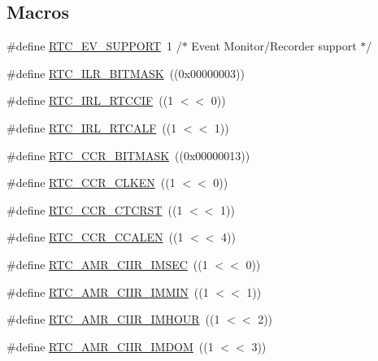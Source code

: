 \subsection*{Macros}
\begin{DoxyCompactItemize}
\item 
\#define \hyperlink{group___r_t_c__18_x_x__43_x_x_gaeebb09cabedc374d2fd54020862be3cf}{R\+T\+C\+\_\+\+E\+V\+\_\+\+S\+U\+P\+P\+O\+RT}~1				/$\ast$ Event Monitor/Recorder support $\ast$/
\item 
\#define \hyperlink{group___r_t_c__18_x_x__43_x_x_ga9c00baff0fca4f8e747fadfe9ee12775}{R\+T\+C\+\_\+\+I\+L\+R\+\_\+\+B\+I\+T\+M\+A\+SK}~((0x00000003))
\item 
\#define \hyperlink{group___r_t_c__18_x_x__43_x_x_gaf706fff68e830a082d476467fe71f297}{R\+T\+C\+\_\+\+I\+R\+L\+\_\+\+R\+T\+C\+C\+IF}~((1 $<$$<$ 0))
\item 
\#define \hyperlink{group___r_t_c__18_x_x__43_x_x_ga237351d2c7f08b447254eff9578eb11e}{R\+T\+C\+\_\+\+I\+R\+L\+\_\+\+R\+T\+C\+A\+LF}~((1 $<$$<$ 1))
\item 
\#define \hyperlink{group___r_t_c__18_x_x__43_x_x_gadc461b6f544d66841e09499b2b9734c7}{R\+T\+C\+\_\+\+C\+C\+R\+\_\+\+B\+I\+T\+M\+A\+SK}~((0x00000013))
\item 
\#define \hyperlink{group___r_t_c__18_x_x__43_x_x_gad08af035635f5acd7931cb982f95e771}{R\+T\+C\+\_\+\+C\+C\+R\+\_\+\+C\+L\+K\+EN}~((1 $<$$<$ 0))
\item 
\#define \hyperlink{group___r_t_c__18_x_x__43_x_x_ga70900054432c82dad7d63d4598502923}{R\+T\+C\+\_\+\+C\+C\+R\+\_\+\+C\+T\+C\+R\+ST}~((1 $<$$<$ 1))
\item 
\#define \hyperlink{group___r_t_c__18_x_x__43_x_x_gaeb77b2340d896fae77ea670bb70e972e}{R\+T\+C\+\_\+\+C\+C\+R\+\_\+\+C\+C\+A\+L\+EN}~((1 $<$$<$ 4))
\item 
\#define \hyperlink{group___r_t_c__18_x_x__43_x_x_ga30c785b6017020d4c0b61b22aff30aac}{R\+T\+C\+\_\+\+A\+M\+R\+\_\+\+C\+I\+I\+R\+\_\+\+I\+M\+S\+EC}~((1 $<$$<$ 0))
\item 
\#define \hyperlink{group___r_t_c__18_x_x__43_x_x_ga3d67e7c72ec7bcd0831628841496cbc6}{R\+T\+C\+\_\+\+A\+M\+R\+\_\+\+C\+I\+I\+R\+\_\+\+I\+M\+M\+IN}~((1 $<$$<$ 1))
\item 
\#define \hyperlink{group___r_t_c__18_x_x__43_x_x_ga4e20983ef05abf10773186d3193270f9}{R\+T\+C\+\_\+\+A\+M\+R\+\_\+\+C\+I\+I\+R\+\_\+\+I\+M\+H\+O\+UR}~((1 $<$$<$ 2))
\item 
\#define \hyperlink{group___r_t_c__18_x_x__43_x_x_gacd23cffe1367b6bb612fb37ebdf2e279}{R\+T\+C\+\_\+\+A\+M\+R\+\_\+\+C\+I\+I\+R\+\_\+\+I\+M\+D\+OM}~((1 $<$$<$ 3))
$$
\end{DoxyCompactItemize}
